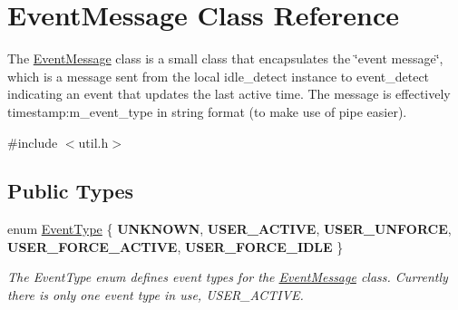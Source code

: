 \hypertarget{classEventMessage}{}\section{Event\+Message Class Reference}
\label{classEventMessage}


The \mbox{\hyperlink{classEventMessage}{Event\+Message}} class is a small class that encapsulates the \char`\"{}event message\char`\"{}, which is a message sent from the local idle\+\_\+detect instance to event\+\_\+detect indicating an event that updates the last active time. The message is effectively timestamp\+:m\+\_\+event\+\_\+type in string format (to make use of pipe easier).  




{\ttfamily \#include $<$util.\+h$>$}

\subsection*{Public Types}
\begin{DoxyCompactItemize}
\item 
\mbox{\label{classEventMessage_a262da559aa416f176fdda72e8b5113ab}} 
enum \mbox{\hyperlink{classEventMessage_a262da559aa416f176fdda72e8b5113ab}{Event\+Type}} \{ \newline
{\bfseries U\+N\+K\+N\+O\+WN}, 
{\bfseries U\+S\+E\+R\+\_\+\+A\+C\+T\+I\+VE}, 
{\bfseries U\+S\+E\+R\+\_\+\+U\+N\+F\+O\+R\+CE}, 
{\bfseries U\+S\+E\+R\+\_\+\+F\+O\+R\+C\+E\+\_\+\+A\+C\+T\+I\+VE}, 
\newline
{\bfseries U\+S\+E\+R\+\_\+\+F\+O\+R\+C\+E\+\_\+\+I\+D\+LE}
 \}
\begin{DoxyCompactList}\small\item\em The Event\+Type enum defines event types for the \mbox{\hyperlink{classEventMessage}{Event\+Message}} class. Currently there is only one event type in use, U\+S\+E\+R\+\_\+\+A\+C\+T\+I\+VE. \end{DoxyCompactList}\end{DoxyCompactItemize}
